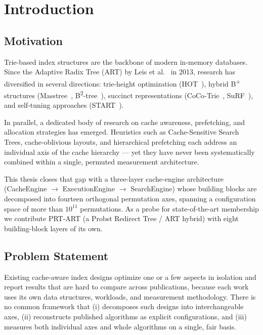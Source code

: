 \chapter{Introduction}\label{ch:intro}

\section{Motivation}\label{sec:motivation}

Trie-based index structures are the backbone of modern in-memory databases.
Since the Adaptive Radix Tree (ART) by Leis et al.~\cite{leis2013art} in 2013,
research has diversified in several directions: trie-height optimization
(HOT~\cite{binna2018hot}), hybrid B\textsuperscript{+} structures
(Masstree~\cite{mao2012masstree}, B\textsuperscript{2}-tree~\cite{schmeisser2022b2tree}),
succinct representations (CoCo-Trie~\cite{boffa2024coco}, SuRF~\cite{zhang2018surf}),
and self-tuning approaches (START~\cite{fent2020start}).

In parallel, a dedicated body of research on cache awareness, prefetching, and
allocation strategies has emerged. Heuristics such as Cache-Sensitive Search
Trees, cache-oblivious layouts, and hierarchical prefetching each address an
individual axis of the cache hierarchy --- yet they have never been
systematically combined within a single, permuted measurement architecture.

This thesis closes that gap with a three-layer cache-engine architecture
(CacheEngine $\to$ ExecutionEngine $\to$ SearchEngine) whose building blocks are
decomposed into fourteen orthogonal permutation axes, spanning a configuration
space of more than $10^{11}$ permutations. As a probe for state-of-the-art
membership we contribute PRT-ART (a Probst Redirect Tree / ART hybrid) with eight
building-block layers of its own.

\section{Problem Statement}\label{sec:problem}

Existing cache-aware index designs optimize one or a few aspects in isolation
and report results that are hard to compare across publications, because each
work uses its own data structures, workloads, and measurement methodology. There
is no common framework that (i) decomposes such designs into interchangeable
axes, (ii) reconstructs published algorithms as explicit configurations, and
(iii) measures both individual axes and whole algorithms on a single, fair basis.

